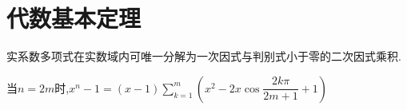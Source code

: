 \section{代数基本定理}
实系数多项式在实数域内可唯一分解为一次因式与判别式小于零的二次因式乘积.

当$ n=2m$时,$ x^n-1=(x-1) \sum_{k=1}^m{( x^2-2x\cos\dfrac{2k\pi}{2m+1}+1 )}$
